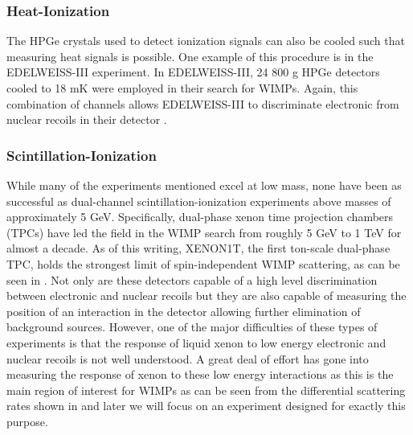 \subsubsection{Heat-Ionization}

The HPGe crystals used to detect ionization signals can also be cooled such that measuring heat signals is possible.  One example of this procedure is in the EDELWEISS-III experiment.  In EDELWEISS-III, 24 800 g HPGe detectors cooled to 18 mK were employed in their search for WIMPs. Again, this combination of channels allows EDELWEISS-III to discriminate electronic from nuclear recoils in their detector \cite{armengaud2016constraints}.

\subsubsection{Scintillation-Ionization}

While many of the experiments mentioned excel at low mass, none have been as successful as dual-channel scintillation-ionization experiments above masses of approximately 5 GeV.  Specifically, dual-phase xenon time projection chambers (TPCs) have led the field in the WIMP search from roughly 5 GeV to 1 TeV for almost a decade.  As of this writing, XENON1T, the first ton-scale dual-phase TPC, holds the strongest limit of spin-independent WIMP scattering, as can be seen in  \cite{aprile2017first, collaboration2017dark}.  Not only are these detectors capable of a high level discrimination between electronic and nuclear recoils but they are also capable of measuring the position of an interaction in the detector allowing further elimination of background sources.  However, one of the major difficulties of these types of experiments is that the response of liquid xenon to low energy electronic and nuclear recoils is not well understood.  A great deal of effort has gone into measuring the response of xenon to these low energy interactions as this is the main region of interest for WIMPs as can be seen from the differential scattering rates shown in  and later we will focus on an experiment designed for exactly this purpose.

